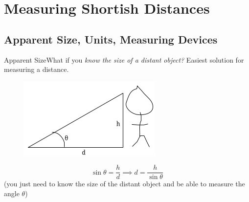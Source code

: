 \documentclass[12pt]{beamer}
\begin{document}
\section{Measuring Shortish Distances}
    \subsection{Apparent Size, Units, Measuring Devices}
        \begin{frame}{Apparent Size}{What if you \textit{know the size of a distant object?}} \centering
            Easiest solution for measuring a distance.
            \begin{figure}
                \includegraphics[scale=0.6, bb=0 0 280 160]{angletriangle.png}
            \end{figure}
            \pause
            \[\sin{\theta}=\frac{h}{d} \implies d=\frac{h}{\sin{\theta}}\]
            \pause
            (you just need to know the size of the distant object and be able to measure the angle $\theta$)
        \end{frame}
\end{document}
